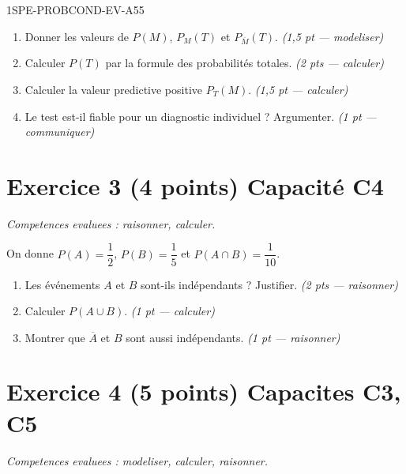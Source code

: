 \begin{evaluation}{1SPE-PROBCOND-EV-A}{55}
\begin{enumerate}
  \item Donner les valeurs de $P(M)$, $P_M(T)$ et $P_{\overline{M}}(T)$.
  \hfill\textit{(1,5 pt --- modeliser)}

  \item Calculer $P(T)$ par la formule des probabilités totales.
  \hfill\textit{(2 pts --- calculer)}

  \item Calculer la valeur predictive positive $P_T(M)$.
  \hfill\textit{(1,5 pt --- calculer)}

  \item Le test est-il fiable pour un diagnostic individuel ? Argumenter.
  \hfill\textit{(1 pt --- communiquer)}
\end{enumerate}

\section*{Exercice 3 \hfill (4 points) \hfill Capacité C4}

\textit{Competences evaluees : raisonner, calculer.}

\medskip
On donne $P(A) = \dfrac{1}{2}$, $P(B) = \dfrac{1}{5}$ et $P(A \cap B) = \dfrac{1}{10}$.

\begin{enumerate}
  \item Les événements $A$ et $B$ sont-ils indépendants ? Justifier.
  \hfill\textit{(2 pts --- raisonner)}

  \item Calculer $P(A \cup B)$.
  \hfill\textit{(1 pt --- calculer)}

  \item Montrer que $\overline{A}$ et $B$ sont aussi indépendants.
  \hfill\textit{(1 pt --- raisonner)}
\end{enumerate}

\section*{Exercice 4 \hfill (5 points) \hfill Capacites C3, C5}

\textit{Competences evaluees : modeliser, calculer, raisonner.}


\end{evaluation}
